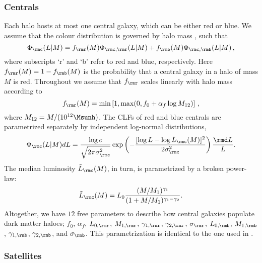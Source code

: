 \documentclass[fleqn,usenatbib,useAMS]{mnras}
\begin{document}
	\subsubsection{Centrals}
	
	Each halo hosts at most one central galaxy, which can be either red or blue. We assume that the colour distribution is governed by halo mass \citep[see e.g.][]{More+11, Mandelbaum+16, Zu+16}, such that
	\begin{equation}
	\Phi_\rmc (L | M) = f_\rmr (M) \Phi_{\rmc, \rmr}(L | M)+ f_\rmb (M) \Phi_{\rmc, \rmb}(L | M)\,,
	\end{equation}
	where subscripts `r' and `b' refer to red and blue, respectively. Here $f_\rmr (M) = 1 - f_\rmb(M)$ is the probability that a central galaxy in a halo of mass $M$ is red. Throughout we assume that $f_\rmr$ scales linearly with halo mass according to
	\begin{equation}
	f_\rmr (M) = \min\left[1, \max(0, f_0 + \alpha_f \log M_{12})\right]\,,
	\end{equation}
	where $M_{12} = M / (10^{12} \Msunh)$. The CLFs of red and blue centrals are parametrized separately by independent log-normal distributions,
	\begin{equation}
	\Phi_\rmc (L | M) dL = \frac{\log e}{\sqrt{2\pi \sigma_\rmc^2}} \exp \left( -\frac{[\log L - \log \tilde L_\rmc (M)]^2}{2 \sigma_\rmc^2} \right) \frac{\rmd L}{L}.
	\end{equation}
	The median luminosity $\tilde L_\rmc (M)$, in turn, is parametrized by a broken
	power-law:
	\begin{equation}
	\tilde L_\rmc (M) = L_0 \frac{(M / M_1)^{\gamma_1}}{(1 + M / M_1)^{\gamma_1 - \gamma_2}}.
	\end{equation}
	Altogether, we have $12$ free parameters to describe how central galaxies populate dark matter haloes; $f_0$, $\alpha_f$, $L_{0, \rmr}$, $M_{1, \rmr}$, $\gamma_{1, \rmr}$, $\gamma_{2, \rmr}$, $\sigma_\rmr$, $L_{0, \rmb}$, $M_{1, \rmb}$, $\gamma_{1, \rmb}$, $\gamma_{2, \rmb}$, and $\sigma_\rmb$. This parametrization is identical to the one used in \cite{More+11}.
	
	\subsubsection{Satellites}
	
\end{document}
